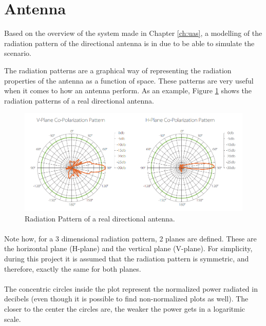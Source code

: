 \section{Antenna}\label{sec:antenna}

Based on the overview of the system made in Chapter \ref{ch:uas}, a modelling of the radiation pattern of the directional antenna is in due to be able to simulate the scenario.

The radiation patterns are a graphical way of representing the radiation properties of the antenna as a function of space. These patterns are very useful when it comes to how an antenna perform. As an example, Figure \ref{fig:radpattern} shows the radiation patterns of a real directional antenna.

\begin{figure}[H]
	\centerline{
	\includegraphics[scale=0.5]{figures/radpattern.png}}
	\caption{Radiation Pattern of a real directional antenna.}
	\label{fig:radpattern}
\end{figure}

\paragraph{}Note how, for a 3 dimensional radiation pattern, 2 planes are defined. These are the horizontal plane (H-plane) and the vertical plane (V-plane). For simplicity, during this project it is assumed that the radiation pattern is symmetric, and therefore, exactly the same for both planes.

\paragraph{}The concentric circles inside the plot represent the normalized power radiated in decibels (even though it is possible to find non-normalized plots as well). The closer to the center the circles are, the weaker the power gets in a logaritmic scale. 

